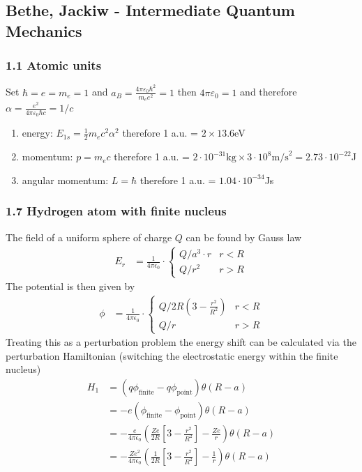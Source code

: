 \documentclass[10pt,a4paper]{article}
\theoremstyle{definition}
\begin{document}
\subsection{{\sc Bethe, Jackiw} - Intermediate Quantum Mechanics}
\subsubsection{1.1 Atomic units}
Set $\hbar=e=m_e=1$ and $a_B=\frac{4\pi\varepsilon_0\hbar^2}{m_ee^2}=1$ then $4\pi\varepsilon_0=1$ and therefore $\alpha=\frac{e^2}{4\pi\varepsilon_0\hbar c}=1/c$
\begin{enumerate}
\item energy: $E_{1s}=\frac{1}{2}m_ec^2\alpha^2$ therefore 1 a.u. = $2\times13.6$eV
\item momentum: $p=m_e c$ therefore 1 a.u. = $2\cdot 10^{-31}\text{kg}\times 3\cdot 10^8\text{m/s}^2=2.73\cdot10^{-22}$J
\item angular momentum: $L=\hbar$ therefore 1 a.u. = $1.04\cdot10^{-34}$Js 
\end{enumerate}

\subsubsection{1.7 Hydrogen atom with finite nucleus}
The field of a uniform sphere of charge $Q$ can be found by Gauss law
\begin{align}
E_r&=\frac{1}{4\pi\epsilon_0}\cdot\left\{
\begin{array}{ll}
Q/a^3\cdot r & r<R\\
Q/r^2 & r>R
\end{array}
\right.
\end{align}
The potential is then given by
\begin{align}
\phi&=\frac{1}{4\pi\epsilon_0}\cdot\left\{
\begin{array}{ll}
Q/2R\left(3-\frac{r^2}{R^2}\right) & r<R\\
Q/r & r>R
\end{array}
\right.
\end{align}
Treating this as a perturbation problem the energy shift can be calculated via the perturbation Hamiltonian (switching the electrostatic energy within the finite nucleus)
\begin{align}
H_1
&=(q\phi_\text{finite}-q\phi_\text{point})\theta(R-a)\\
&=-e\left(\phi_\text{finite}-\phi_\text{point}\right)\theta(R-a)\\
&=-\frac{e}{4\pi\epsilon_0}\left(\frac{Ze}{2R}
\left[3-\frac{r^2}{R^2}\right]-\frac{Ze}{r}\right)\theta(R-a)\\
&=-\frac{Ze^2}{4\pi\epsilon_0}\left(\frac{1}{2R}
\left[3-\frac{r^2}{R^2}\right]-\frac{1}{r}\right)\theta(R-a)\\
\end{align}
\end{document}

